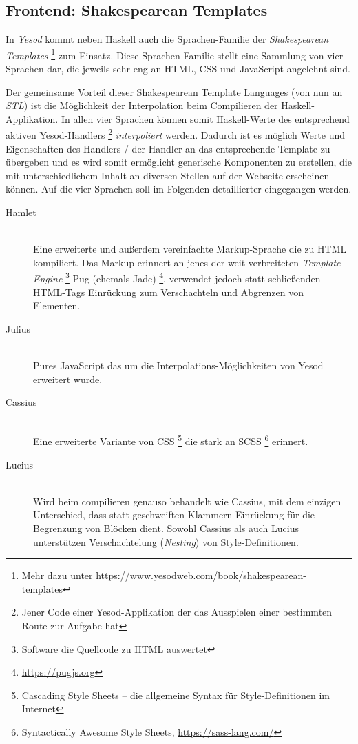 \documentclass[11pt,a4paper,twoside,ngerman]{article}
\begin{document}
\subsection{Frontend: Shakespearean Templates}
In \emph{Yesod} kommt neben Haskell auch die Sprachen-Familie der \emph{Shakespearean Templates} \footnote{Mehr dazu unter \url{https://www.yesodweb.com/book/shakespearean-templates}} zum Einsatz. Diese Sprachen-Familie stellt eine Sammlung von vier Sprachen dar, die jeweils sehr eng an HTML, CSS und JavaScript angelehnt sind.

Der gemeinsame Vorteil dieser Shakespearean Template Languages (von nun an \emph{STL}) ist die Möglichkeit der Interpolation beim Compilieren der Haskell-Applikation. In allen vier Sprachen können somit Haskell-Werte des entsprechend aktiven Yesod-Handlers \footnote{Jener Code einer Yesod-Applikation der das Ausspielen einer bestimmten Route zur Aufgabe hat} \emph{interpoliert} werden. Dadurch ist es möglich Werte und Eigenschaften des Handlers / der Handler an das entsprechende Template zu übergeben und es wird somit ermöglicht generische Komponenten zu erstellen, die mit unterschiedlichem Inhalt an diversen Stellen auf der Webseite erscheinen können. Auf die vier Sprachen soll im Folgenden detaillierter eingegangen werden.

\begin{description}
    \item[Hamlet] \hfill \\ Eine erweiterte und außerdem vereinfachte Markup-Sprache die zu HTML kompiliert. Das Markup erinnert an jenes der weit verbreiteten \emph{Template-Engine} \footnote{Software die Quellcode zu HTML auswertet} Pug (ehemals Jade) \footnote{\url{https://pugjs.org}}, verwendet jedoch statt schließenden HTML-Tags Einrückung zum Verschachteln und Abgrenzen von Elementen.
    \item[Julius] \hfill \\ Pures JavaScript das um die Interpolations-Möglichkeiten von Yesod erweitert wurde.
    \item[Cassius] \hfill \\ Eine erweiterte Variante von CSS \footnote{Cascading Style Sheets -- die allgemeine Syntax für Style-Definitionen im Internet} die stark an SCSS \footnote{Syntactically Awesome Style Sheets, \url{https://sass-lang.com/}} erinnert.
    \item[Lucius] \hfill \\ Wird beim compilieren genauso behandelt wie Cassius, mit dem einzigen Unterschied, dass statt geschweiften Klammern Einrückung für die Begrenzung von Blöcken dient. Sowohl Cassius als auch Lucius unterstützen Verschachtelung (\emph{Nesting}) von Style-Definitionen.
\end{description}
\end{document}
